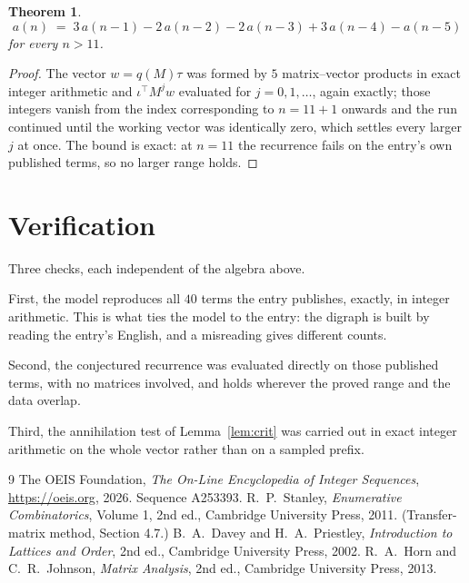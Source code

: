 \documentclass[11pt,a4paper]{article}
\theoremstyle{plain}
\newtheorem{theorem}{Theorem}
\theoremstyle{definition}
\begin{document}
\begin{theorem}
\[
a(n)\;=\;3\,a(n-1) - 2\,a(n-2) - 2\,a(n-3) + 3\,a(n-4) - a(n-5)
\]
for every $n>11$.
\end{theorem}

\begin{proof}
The vector $w=q(M)\tau$ was formed by $5$ matrix--vector products in exact integer
arithmetic and $\iota^{\!\top}M^{j}w$ evaluated for $j=0,1,\dots$, again exactly; those
integers vanish from the index corresponding to $n=11+1$ onwards and the run continued
until the working vector was identically zero, which settles every larger $j$ at once. The bound is exact: at $n=11$ the recurrence fails on the entry's own published terms, so no larger range holds.
\end{proof}

\section{Verification}

Three checks, each independent of the algebra above.

First, the model reproduces all $40$ terms the entry publishes, exactly, in integer
arithmetic. This is what ties the model to the entry: the digraph is built by reading the
entry's English, and a misreading gives different counts.

Second, the conjectured recurrence was evaluated directly on those published terms, with no
matrices involved, and holds wherever the proved range and the data overlap.

Third, the annihilation test of Lemma~\ref{lem:crit} was carried out in exact integer
arithmetic on the whole vector rather than on a sampled prefix.

\begin{thebibliography}{9}
 The OEIS Foundation, \emph{The On-Line Encyclopedia of Integer
Sequences}, \url{https://oeis.org}, 2026. Sequence A253393.
 R.~P.~Stanley, \emph{Enumerative Combinatorics}, Volume 1, 2nd ed.,
Cambridge University Press, 2011. (Transfer-matrix method, Section 4.7.)
 B.~A.~Davey and H.~A.~Priestley, \emph{Introduction to Lattices and
Order}, 2nd ed., Cambridge University Press, 2002.
 R.~A.~Horn and C.~R.~Johnson, \emph{Matrix Analysis}, 2nd ed., Cambridge
University Press, 2013.
\end{thebibliography}
\end{document}
